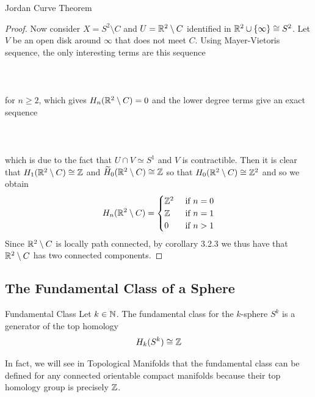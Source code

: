 \documentclass[a4paper]{article}
\begin{document}
\begin{thm}{Jordan Curve Theorem}{}
\begin{proof}
Now consider $X=S^2\setminus C$ and $U=\mathbb{R}^2\setminus C$ identified in $\mathbb{R}^2\cup\{\infty\}\cong S^2$. Let $V$ be an open disk around $\infty$ that does not meet $C$. Using Mayer-Vietoris sequence, the only interesting terms are this sequence \\~\\
\\~\\
for $n\geq 2$, which gives $H_n(\mathbb{R}^2\setminus C)=0$ and the lower degree terms give an exact sequence \\~\\
\\~\\
which is due to the fact that $U\cap V\simeq S^1$ and $V$ is contractible. Then it is clear that $H_1(\mathbb{R}^2\setminus C)\cong\mathbb{Z}$ and $\widetilde{H}_0(\mathbb{R}^2\setminus C)\cong\mathbb{Z}$ so that $H_0(\mathbb{R}^2\setminus C)\cong\mathbb{Z}^2$ and so we obtain $$H_n(\mathbb{R}^2\setminus C)=\begin{cases}
\mathbb{Z}^2 & \text{ if } n=0\\
\mathbb{Z} & \text{ if } n=1\\
0 & \text{ if } n>1
\end{cases}$$
Since $\mathbb{R}^2\setminus C$ is locally path connected, by corollary 3.2.3 we thus have that $\mathbb{R}^2\setminus C$ has two connected components. 
\end{proof}
\end{thm}

\subsection{The Fundamental Class of a Sphere}
\begin{defn}{Fundamental Class}{} Let $k\in\mathbb{N}$. The fundamental class for the $k$-sphere $S^k$ is a generator of the top homology $$H_k(S^k)\cong\mathbb{Z}$$
\end{defn}

In fact, we will see in Topological Manifolds that the fundamental class can be defined for any connected orientable compact manifolds because their top homology group is precisely $\mathbb{Z}$. \\~\\
\end{document}
